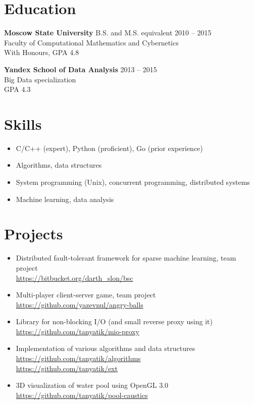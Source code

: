\documentclass[margin]{res}
\begin{document}
\begin{resume}
\section{Education}
\textbf{Moscow State University} B.S. and M.S. equivalent \hfill 2010 -- 2015 \\
Faculty of Computational Mathematics and Cybernetics \\
With Honours, GPA 4.8

\textbf{Yandex School of Data Analysis} \hfill 2013 -- 2015 \\
Big Data specialization \\
GPA 4.3

\section{Skills}
\begin{itemize} \itemsep -2pt \topsep 0ex
\item C/C++ (expert), Python (proficient), Go (prior experience)
\item Algorithms, data structures
\item System programming (Unix), concurrent programming, distributed systems
\item Machine learning, data analysis
\end{itemize}

\section{Projects}
\begin{itemize} \itemsep -2pt \topsep 0ex
\item Distributed fault-tolerant framework for sparse machine learning, team project \\
\url{https://bitbucket.org/darth_slon/bsc}
\item Multi-player client-server game, team project \\
\url{https://github.com/yazevnul/angry-balls}
\item Library for non-blocking I/O (and small reverse proxy using it) \\
\url{https://github.com/tanyatik/mio-proxy}
\item Implementation of various algorithms and data structures \\
\url{https://github.com/tanyatik/algorithms} \\
\url{https://github.com/tanyatik/ext}
\item 3D visualization of water pool using OpenGL 3.0 \\
\url{https://github.com/tanyatik/pool-caustics}
\end{itemize}


%
\end{resume}
\end{document}
